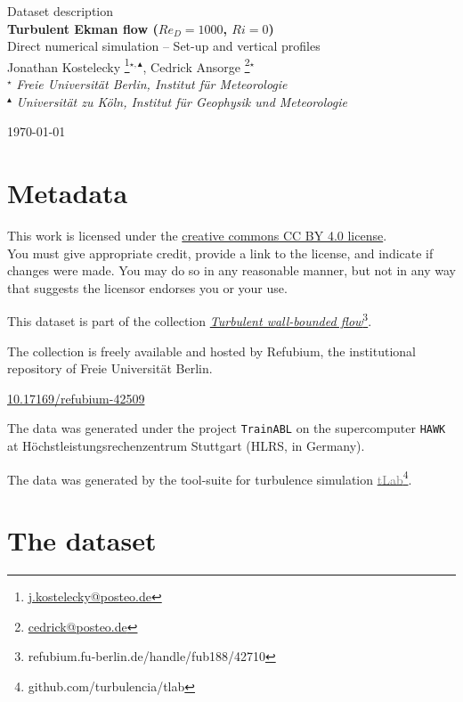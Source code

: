 \documentclass[11pt]{article}
\date{\nodate}
\makeatletter
\newcommand{\dstitle}{Turbulent Ekman flow ($Re_D=1000$, $Ri=0$)}
\newcommand{\subtitle}{Direct numerical simulation -- Set-up and vertical profiles}
\newcommand{\doi}{10.17169/refubium-42509}
\newcommand{\tlabName}{\textcolor{gray}{tLab}}
\newcommand{\authors}{
    Jonathan Kostelecky \footnote{\href{mailto:j.kostelecky@posteo.de}{j.kostelecky@posteo.de}}$^{\star,\blacktriangle}$, \hspace{0.05cm}  
    Cedrick Ansorge     \footnote{\href{mailto:cedrick@posteo.de}{cedrick@posteo.de}}$^\star$ \\  
    {\small \light{$^\star$ \emph{ Freie Universit\"at Berlin, Institut f\"ur Meteorologie} \\
    $^{\blacktriangle}$ \emph{Universit\"at zu K\"oln, Institut f\"ur Geophysik und Meteorologie}}}}
\newcommand{\light}[1]{\textcolor{black!80}{#1}}
\newcommand{\printdoi}[1]{\href{https://dx.doi.org/#1}{#1}}
\makeatother
\begin{document}
{ \selectfont
\begin{centering}

 \light{\large Dataset description} \\[1em] 
 {\LARGE \bfseries \sffamily\dstitle} \\[1em]
 \light{\large\subtitle} \\[1em]
 \authors\\ 
\end{centering}
\light{\hfill \today}
}


\section{Metadata}
\begin{description}
\sffamily
\item[\textcopyright] This work is licensed under the \href{https://creativecommons.org/licenses/by/4.0}{creative commons CC BY 4.0 license}. \\ {\small\light{You must give appropriate credit, provide a link to the license, and indicate if changes were made. You may do so in any reasonable manner, but not in any way that suggests the licensor endorses you or your use. }}
\item[\sffamily Collection] This dataset is part of the collection \href{https://refubium.fu-berlin.de/handle/fub188/42710}{\emph{Turbulent wall-bounded flow}\footnote{\url{refubium.fu-berlin.de/handle/fub188/42710}}}.

{\small \light{The collection is freely available and hosted by Refubium, the  institutional repository of Freie Universit\"at Berlin.}}

\item[\sffamily DOI]\printdoi{\doi}
\item[\sffamily HPC systems] The data was generated under the project \texttt{TrainABL} on the supercomputer \texttt{HAWK} at Höchstleistungsrechenzentrum Stuttgart (HLRS, in Germany). 
\item[\sffamily Code] The data was generated by the tool-suite for turbulence simulation \href{https://github.com/turbulencia/tlab}{\tlabName\footnote{\url{github.com/turbulencia/tlab}}}.
\end{description}

\section{The dataset}
\end{document}
